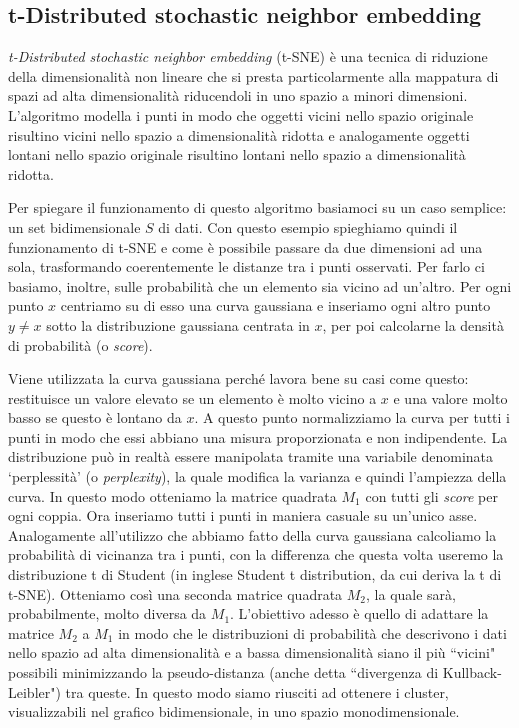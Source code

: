 \documentclass[12pt,italian]{report}
\begin{document}
\subsection{t-Distributed stochastic neighbor embedding}
\emph{t-Distributed stochastic neighbor embedding} (t-SNE) è una tecnica di riduzione della dimensionalità non lineare che si presta particolarmente alla mappatura di spazi ad alta dimensionalità riducendoli in uno spazio a minori dimensioni. L'algoritmo modella i punti in modo che oggetti vicini nello spazio originale risultino vicini nello spazio a dimensionalità ridotta e analogamente oggetti lontani nello spazio originale risultino lontani nello spazio a dimensionalità ridotta.

Per spiegare il funzionamento di questo algoritmo basiamoci su un caso semplice: un set bidimensionale $S$ di dati. Con questo esempio spieghiamo quindi il funzionamento di t-SNE e come è possibile passare da due dimensioni ad una sola, trasformando coerentemente le distanze tra i punti osservati. Per farlo ci basiamo, inoltre, sulle probabilità che un elemento sia vicino ad un'altro. Per ogni punto $ x $ centriamo su di esso una curva gaussiana e inseriamo ogni altro punto $ y \neq x $ 
sotto la distribuzione gaussiana centrata in $ x $, per poi calcolarne la densità di probabilità (o \emph{score}).

Viene utilizzata la curva gaussiana perché lavora bene su casi come questo: restituisce un valore elevato se un elemento è molto vicino a $x$ e una valore molto basso se questo è lontano da $x$. A questo punto normalizziamo la curva per tutti i punti in modo che essi abbiano una misura proporzionata e non indipendente. La distribuzione può in realtà essere manipolata tramite una variabile denominata `perplessità' (o \emph{perplexity}), la quale modifica la varianza e quindi l'ampiezza della curva.
In questo modo otteniamo la matrice quadrata $ M_{1} $ con tutti gli \emph{score} per ogni coppia. Ora inseriamo tutti i punti in maniera casuale su un'unico asse. Analogamente all'utilizzo che abbiamo fatto della curva gaussiana calcoliamo la probabilità di vicinanza tra i punti, con la differenza che questa volta useremo la distribuzione t di Student (in inglese Student t distribution, da cui deriva la t di t-SNE). Otteniamo così una seconda matrice quadrata $ M_{2} $, la quale sarà, probabilmente, molto diversa da $ M_{1} $. L'obiettivo adesso è quello di adattare la matrice $ M_{2} $ a $ M_{1} $ in modo che le distribuzioni di probabilità che descrivono i dati nello spazio ad alta dimensionalità e a bassa dimensionalità siano il più ``vicini" possibili minimizzando la pseudo-distanza (anche detta ``divergenza di Kullback-Leibler") tra queste. In questo modo siamo riusciti ad ottenere i cluster, visualizzabili nel grafico bidimensionale, in uno spazio monodimensionale.
\end{document}
